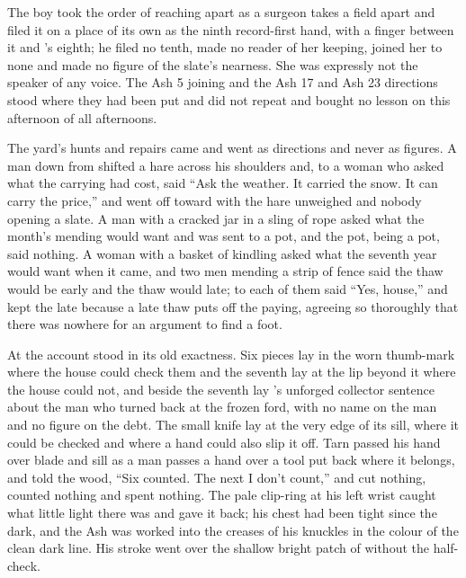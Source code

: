 The boy took the order of reaching apart as a surgeon takes a field apart and filed it on a place of its own as the ninth record-first hand, with a finger between it and 's eighth; he filed no tenth, made no reader of her keeping, joined her to none and made no figure of the slate's nearness. She was expressly not the speaker of any voice. The Ash 5 joining and the Ash 17 and Ash 23 directions stood where they had been put and did not repeat and bought no lesson on this afternoon of all afternoons.

The yard's hunts and repairs came and went as directions and never as figures. A man down from  shifted a hare across his shoulders and, to a woman who asked what the carrying had cost, said “Ask the weather. It carried the snow. It can carry the price,” and went off toward  with the hare unweighed and nobody opening a slate. A man with a cracked jar in a sling of rope asked what the month's mending would want and was sent to a pot, and the pot, being a pot, said nothing. A woman with a basket of kindling asked what the seventh year would want when it came, and two men mending a strip of fence said the thaw would be early and the thaw would late; to each of them  said “Yes, house,” and kept the late because a late thaw puts off the paying, agreeing so thoroughly that there was nowhere for an argument to find a foot.

\scenebreak

At  the account stood in its old exactness. Six pieces lay in the worn thumb-mark where the house could check them and the seventh lay at the lip beyond it where the house could not, and beside the seventh lay 's unforged collector sentence about the man who turned back at the frozen ford, with no name on the man and no figure on the debt. The small knife lay at the very edge of its sill, where it could be checked and where a hand could also slip it off. Tarn passed his hand over blade and sill as a man passes a hand over a tool put back where it belongs, and told the wood, “Six counted. The next I don't count,” and cut nothing, counted nothing and spent nothing. The pale clip-ring at his left wrist caught what little light there was and gave it back; his chest had been tight since the dark, and the Ash was worked into the creases of his knuckles in the colour of the clean dark line. His stroke went over the shallow bright patch of  without the half-check.


